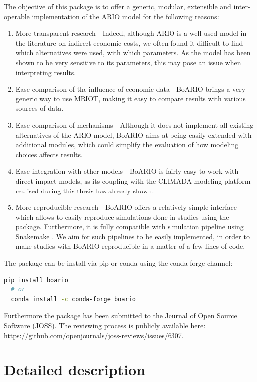 The objective of this package is to offer a generic, modular, extensible and
inter-operable implementation of the ARIO model for the following reasons:
\begin{enumerate}
\item More transparent research - Indeed, although ARIO is a well used model in
  the literature on indirect economic costs, we often found it difficult to find which
  alternatives were used, with which parameters. As the model has been shown to
  be very sensitive to its parameters, this may pose an issue when interpreting
  results.
\item Ease comparison of the influence of economic data - BoARIO brings a very
  generic way to use MRIOT, making it easy to compare results with various
  sources of data.
\item Ease comparison of mechanisms - Although it does not implement all
  existing alternatives of the ARIO model, BoARIO aims at being easily extended
  with additional modules, which could simplify the evaluation of how modeling
  choices affects results.
\item Ease integration with other models - BoARIO is fairly easy to work
  with direct impact models, as its coupling with the CLIMADA modeling platform
  realised during this thesis has already shown.
\item More reproducible research - BoARIO offers a relatively simple interface
  which allows to easily reproduce simulations done in studies using the
  package. Furthermore, it is fully compatible with simulation pipeline using
  Snakemake \parencite{koester-2012-snakem-scalab}. We aim for such pipelines to
  be easily implemented, in order to make studies with BoARIO reproducible in a
  matter of a few lines of code.
\end{enumerate}

The package can be install via pip or conda using the conda-forge channel:
\begin{lstlisting}[language=bash]
  pip install boario
  # or
  conda install -c conda-forge boario
\end{lstlisting}

Furthermore the package has been submitted to the Journal of Open Source
Software (JOSS). The reviewing process is publicly available here:
\url{https://github.com/openjournals/joss-reviews/issues/6307}.

\section{Detailed description}
\label{sec:full-description-ARIO}


